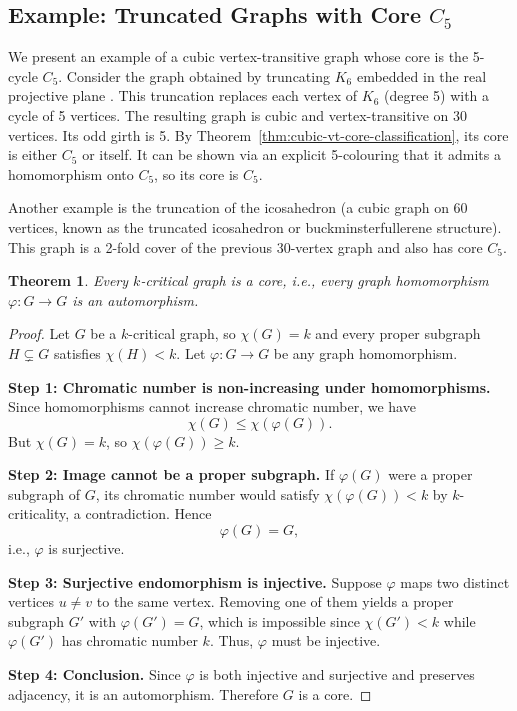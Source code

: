 \documentclass[12pt,a4paper,openany]{book}
\newtheorem{theorem}{Theorem}[section]
\begin{document}
\subsection{Example: Truncated Graphs with Core $C_5$}

We present an example of a cubic vertex-transitive graph whose core is the 5-cycle $C_5$. Consider the graph obtained by truncating $K_6$ embedded in the real projective plane . This truncation replaces each vertex of $K_6$ (degree 5) with a cycle of 5 vertices. The resulting graph is cubic and vertex-transitive on 30 vertices. Its odd girth is 5. By Theorem~\ref{thm:cubic-vt-core-classification}, its core is either $C_5$ or itself. It can be shown via an explicit 5-colouring that it admits a homomorphism onto $C_5$, so its core is $C_5$.

Another example is the truncation of the icosahedron (a cubic graph on 60 vertices, known as the truncated icosahedron or buckminsterfullerene structure). This graph is a 2-fold cover of the previous 30-vertex graph and also has core $C_5$.
\begin{theorem}
Every $k$-critical graph is a \emph{core}, i.e., every graph homomorphism $\varphi: G \to G$ is an automorphism.
\end{theorem}

\begin{proof}
Let $G$ be a $k$-critical graph, so $\chi(G) = k$ and every proper subgraph $H \subsetneq G$ satisfies $\chi(H) < k$. Let $\varphi: G \to G$ be any graph homomorphism.  

\textbf{Step 1: Chromatic number is non-increasing under homomorphisms.}  
Since homomorphisms cannot increase chromatic number, we have
\[
\chi(G) \le \chi(\varphi(G)).
\] 
But $\chi(G) = k$, so $\chi(\varphi(G)) \ge k$.  

\textbf{Step 2: Image cannot be a proper subgraph.}  
If $\varphi(G)$ were a proper subgraph of $G$, its chromatic number would satisfy $\chi(\varphi(G)) < k$ by $k$-criticality, a contradiction. Hence
\[
\varphi(G) = G,
\]
i.e., $\varphi$ is surjective.  

\textbf{Step 3: Surjective endomorphism is injective.}  
Suppose $\varphi$ maps two distinct vertices $u \neq v$ to the same vertex. Removing one of them yields a proper subgraph $G'$ with $\varphi(G') = G$, which is impossible since $\chi(G') < k$ while $\varphi(G')$ has chromatic number $k$. Thus, $\varphi$ must be injective.  

\textbf{Step 4: Conclusion.}  
Since $\varphi$ is both injective and surjective and preserves adjacency, it is an automorphism. Therefore $G$ is a core.
\end{proof}
\end{document}
